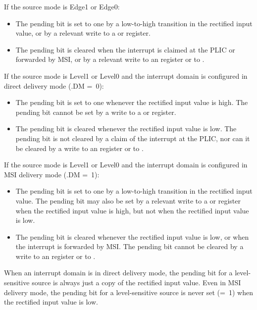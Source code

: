 If the source mode is Edge1 or Edge0:
\begin{itemize}

\item
The pending bit is set to one by a low-to-high transition in the
rectified input value, or by a relevant write to a  or
 register.

\item
The pending bit is cleared when the interrupt is claimed at the PLIC or
forwarded by MSI, or by a relevant write to an  register
or to .

\end{itemize}

If the source mode is Level1 or Level0 and the interrupt domain is
configured in direct delivery mode (.DM =~0):
\begin{itemize}

\item
The pending bit is set to one whenever the rectified input value is
high.
The pending bit cannot be set by a write to a  or 
register.

\item
The pending bit is cleared whenever the rectified input value is low.
The pending bit is not cleared by a claim of the interrupt at the PLIC,
nor can it be cleared by a write to an  register or to
.

\end{itemize}

If the source mode is Level1 or Level0 and the interrupt domain is
configured in MSI delivery mode (.DM =~1):
\begin{itemize}

\item
The pending bit is set to one by a low-to-high transition in the
rectified input value.
The pending bit may also be set by a relevant write to a  or
 register when the rectified input value is high, but not
when the rectified input value is low.

\item
The pending bit is cleared whenever the rectified input value is low,
or when the interrupt is forwarded by MSI.
The pending bit cannot be cleared by a write to an 
register or to .

\end{itemize}

\begin{commentary}
When an interrupt domain is in direct delivery mode, the pending bit
for a level-sensitive source is always just a copy of the rectified
input value.
Even in MSI delivery mode, the pending bit for a level-sensitive source
is never set (=~1) when the rectified input value is low.
\end{commentary}

